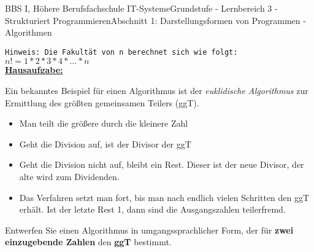 \documentclass[oneside,openany,headings=optiontotoc,11pt,numbers=noenddot]{scrreprt}
\begin{document}
\begin{worksheet}{BBS I, Höhere Berufsfachschule IT-Systeme}{Grundstufe - Lernbereich 3 - Strukturiert Programmieren}{Abschnitt 1: Darstellungsformen von Programmen - Algorithmen}
\begin{framed}
			 	\footnotesize{\texttt{Hinweis: Die Fakultät von n berechnet sich wie folgt:\\
			 	\(n! = 1 * 2 * 3 * 4 * \ldots * n\)}}\\
		 		\normalsize
		 		\newpage
		 		\noindent
		 		\underline{\textbf{Hausaufgabe:}}\\
		 		\par\noindent
		 		Ein bekanntes Beispiel für einen Algorithmus ist der \textit{euklidische Algorithmus} zur Ermittlung des größten gemeinsamen Teilers (ggT).
		 		\begin{itemize}[label=-]
		 			\item Man teilt die größere durch die kleinere Zahl
		 			\item Geht die Division auf, ist der Divisor der ggT
		 			\item Geht die Division nicht auf, bleibt ein Rest. Dieser ist der neue Divisor, der alte wird zum Dividenden.
		 			\item Das Verfahren setzt man fort, bis man nach endlich vielen Schritten den ggT erhält. Ist der letzte Rest 1, dann sind die Ausgangszahlen teilerfremd.
		 		\end{itemize}
	 			Entwerfen Sie einen Algorithmus in umgangssprachlicher Form, der für \textbf{zwei einzugebende Zahlen} den \textbf{ggT} bestimmt.
			\end{framed}
		\end{worksheet}
\end{document}
